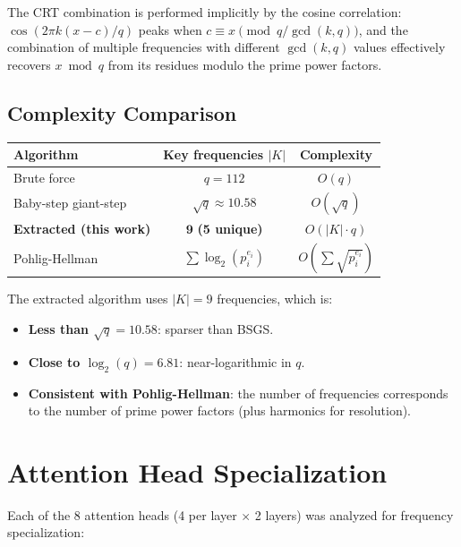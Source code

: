 \documentclass[11pt]{article}
\begin{document}
The CRT combination is performed implicitly by the cosine correlation: $\cos(2\pi k (x - c) / q)$ peaks when $c \equiv x \pmod{q/\gcd(k,q)}$, and the combination of multiple frequencies with different $\gcd(k, q)$ values effectively recovers $x \bmod q$ from its residues modulo the prime power factors.

\subsection{Complexity Comparison}

\begin{center}
\begin{tabular}{lcc}
\toprule
\textbf{Algorithm} & \textbf{Key frequencies $|K|$} & \textbf{Complexity} \\
\midrule
Brute force & $q = 112$ & $O(q)$ \\
Baby-step giant-step & $\sqrt{q} \approx 10.58$ & $O(\sqrt{q})$ \\
\textbf{Extracted (this work)} & $\mathbf{9}$ \textbf{(5 unique)} & $O(|K| \cdot q)$ \\
Pohlig-Hellman & $\sum \log_2(p_i^{e_i})$ & $O(\sum \sqrt{p_i^{e_i}})$ \\
\bottomrule
\end{tabular}
\end{center}

The extracted algorithm uses $|K| = 9$ frequencies, which is:
\begin{itemize}[leftmargin=*]
    \item \textbf{Less than $\sqrt{q} = 10.58$}: sparser than BSGS.
    \item \textbf{Close to $\log_2(q) = 6.81$}: near-logarithmic in $q$.
    \item \textbf{Consistent with Pohlig-Hellman}: the number of frequencies corresponds to the number of prime power factors (plus harmonics for resolution).
\end{itemize}


\section{Attention Head Specialization}

Each of the 8 attention heads (4 per layer $\times$ 2 layers) was analyzed for frequency specialization:
\end{document}
